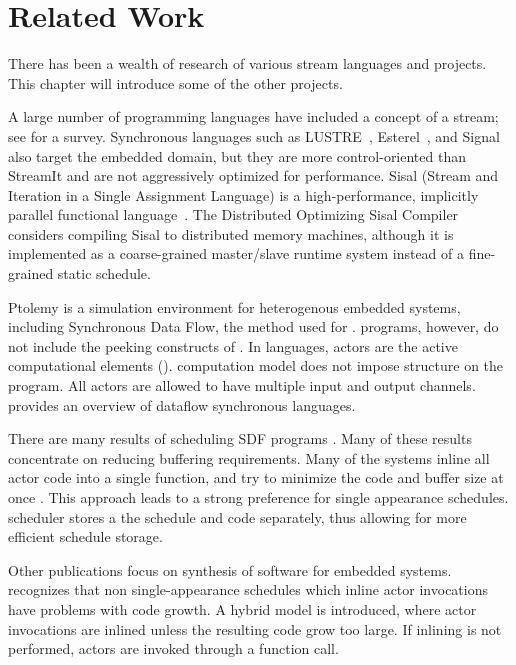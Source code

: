 \section{Related Work}

There has been a wealth of research of various stream languages
and projects.  This chapter will introduce some of the other
projects.

A large number of programming languages have included a concept of
a stream; see \cite{survey97} for a survey.  Synchronous languages
such as LUSTRE~\cite{lustre}, Esterel~\cite{esterel92}, and
Signal~\cite{signal} also target the embedded domain, but they are
more control-oriented than StreamIt and are not aggressively
optimized for performance.  Sisal (Stream and Iteration in a
Single Assignment Language) is a high-performance, implicitly
parallel functional language~\cite{sisal}.  The Distributed
Optimizing Sisal Compiler~\cite{sisal} considers compiling Sisal
to distributed memory machines, although it is implemented as a
coarse-grained master/slave runtime system instead of a
fine-grained static schedule.

Ptolemy \cite{ptolemyoverview} is a simulation environment for
heterogenous embedded systems, including Synchronous Data Flow,
the method used for \StreamIt. \SDF programs, however, do not
include the peeking constructs of {\StreamIt}.  In \SDF languages,
actors are the active computational elements ({\filters}).  \SDF
computation model does not impose structure on the program.  All
actors are allowed to have multiple input and output channels.
\cite{benveniste93dataflow} provides an overview of dataflow
synchronous languages.

There are many results of scheduling SDF programs \cite{leesdf}.
Many of these results concentrate on reducing buffering
requirements. Many of the systems inline all actor code into a
single function, and try to minimize the code and buffer size at
once \cite{bhattacharyya99synthesis}.  This approach leads to a
strong preference for single appearance schedules.  {\StreamIt}
scheduler stores a the schedule and {\filter} code separately, thus
allowing for more efficient schedule storage.

Other publications focus on synthesis of software for embedded
systems. \cite{bhat1999x1} recognizes that non single-appearance
schedules which inline actor invocations have problems with code
growth.  A hybrid model is introduced, where actor invocations are
inlined unless the resulting code grow too large. If inlining is
not performed, actors are invoked through a function call.

